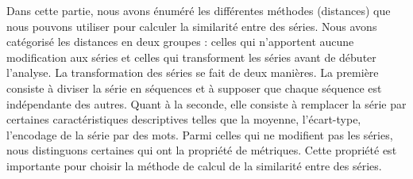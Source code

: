 Dans cette partie, nous avons \'enum\'er\'e les diff\'erentes m\'ethodes (distances) que nous pouvons utiliser pour calculer la similarit\'e entre des s\'eries. Nous avons cat\'egoris\'e les distances en deux groupes : 
celles qui n'apportent aucune modification aux s\'eries et 
celles qui transforment les s\'eries avant de d\'ebuter l'analyse. 
La transformation des s\'eries se fait de deux mani\`eres. La premi\`ere consiste \`a diviser la s\'erie en s\'equences et \`a supposer que chaque s\'equence est ind\'ependante des autres. 
Quant \`a la seconde, elle consiste \`a remplacer la s\'erie par certaines caract\'eristiques descriptives telles que la moyenne, l'\'ecart-type, l'encodage de la s\'erie par des mots. 
Parmi celles qui ne modifient pas les s\'eries, nous distinguons certaines qui ont la propri\'et\'e de m\'etriques. 
Cette propri\'et\'e est importante pour choisir la m\'ethode de calcul de la similarit\'e entre des s\'eries.   